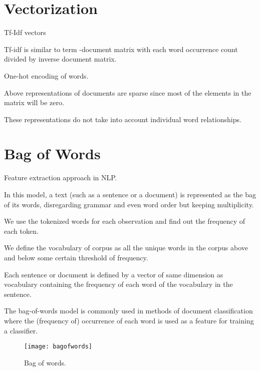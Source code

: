 	\section{Vectorization}
	\begin{bulletedlist}
		\item Tf-Idf vectors
		\begin{bulletedlist}
			\item Tf-idf is similar to term -document matrix with each word occurrence count divided by inverse document matrix.
		\end{bulletedlist}
		\item One-hot encoding of words.
		\item Above representations of documents are sparse since most of the elements in the matrix will be zero.
		\item These representations do not take into account individual word relationships.
	\end{bulletedlist}

	\section{Bag of Words}

	\begin{bulletedlist}
		\item Feature extraction approach in NLP.
		\item In this model, a text (such as a sentence or a document) is represented as the bag of its words, disregarding grammar and even word order but keeping multiplicity.
		\item We use the tokenized words for each observation and find out the frequency of each token.
		\item We define the vocabulary of corpus as all the unique words in the corpus above and below some certain threshold of frequency.
		\item Each sentence or document is defined by a vector of same dimension as vocabulary containing the frequency of each word of the vocabulary in the sentence.
		\item The bag-of-words model is commonly used in methods of document classification where the (frequency of) occurrence of each word is used as a feature for training a classifier.
	\end{bulletedlist}

	\begin{figure}[htb]
		\centering
		\texttt{[image: bagofwords]}
		\caption[Bag of words]{Bag of words.}
		\label{fig:bagofwords}
	\end{figure}


